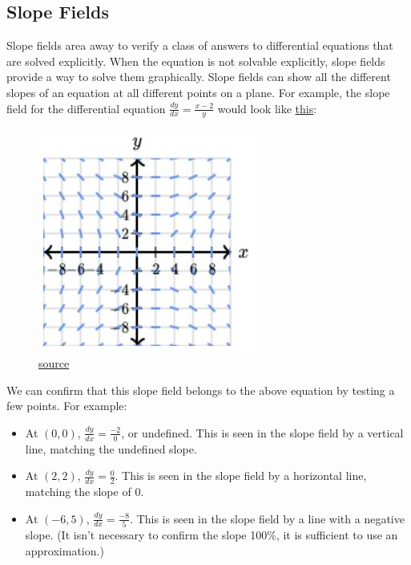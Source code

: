 \documentclass[12pt]{article}
\begin{document}
\subsection{Slope Fields}
Slope fields area away to verify a class of answers to differential equations that are solved explicitly. When the equation is not solvable explicitly, slope fields provide a way to solve them graphically. Slope fields can show all the different slopes of an equation at all different points on a plane. For example, the slope field for the differential equation $\frac{dy}{dx} = \frac{x-2}{y}$ would look like \hyperref[fig:slopefield1]{this}:

\begin{figure}[H]
    \begin{center}
        \includegraphics{fig13.JPG}
        \caption{\href{https://www.khanacademy.org/math/ap-calculus-bc/bc-differential-equations-new}{source}}
        \label{fig:slopefield1}
    \end{center}
\end{figure}

We can confirm that this slope field belongs to the above equation by testing a few points. For example:
\begin{itemize}
    \item At $(0, 0)$, $\frac{dy}{dx} = \frac{-2}{0}$, or undefined. This is seen in the slope field by a vertical line, matching the undefined slope.
    \item At $(2, 2)$, $\frac{dy}{dx} = \frac{0}{2}$. This is seen in the slope field by a horizontal line, matching the slope of $0$.
    \item At $(-6, 5)$, $\frac{dy}{dx} = \frac{-8}{5}$. This is seen in the slope field by a line with a negative slope. (It isn't necessary to confirm the slope 100\%, it is sufficient to use an approximation.)
\end{itemize}
\end{document}
